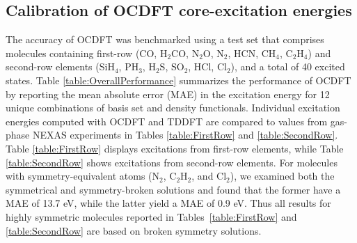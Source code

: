 \documentclass[12pt]{article}
\begin{document}
\subsection{Calibration of OCDFT core-excitation energies}
The accuracy of OCDFT was benchmarked using a test set that comprises molecules containing first-row (CO, H$_2$CO, N$_2$O, N$_2$, HCN, CH$_4$, C$_2$H$_4$) and second-row elements (SiH$_4$, PH$_3$, H$_2$S, SO$_2$, HCl, Cl$_2$), and a total of 40 excited states. 
Table \ref{table:OverallPerformance} summarizes the performance of OCDFT by reporting the mean absolute error (MAE) in the excitation energy for 12 unique combinations of basis set and density functionals.
Individual excitation energies computed with OCDFT and TDDFT are compared to values from gas-phase NEXAS experiments \cite{puttner_vibrationally_1999,remmers_high-resolution_1992,chen_k-shell_1989,tronc_nitrogen_1980,tronc_carbon_1979,francis_studies_1994,adachi_vibronic_1999,hitchcock_k-shell_1979,domke_carbon_1990,nayandin_angle-resolved_2001,bodeur_single-and_1990,gedat_s_1998,hudson_high-resolution_1994,cavell_chemical_1999,bodeur_photoabsorption_1985} in Tables \ref{table:FirstRow} and \ref{table:SecondRow}. Table \ref{table:FirstRow} displays excitations from first-row elements, while Table \ref{table:SecondRow} shows excitations from second-row elements. For molecules with symmetry-equivalent atoms (N$_2$, C$_2$H$_2$, and Cl$_2$), we examined both the symmetrical and symmetry-broken solutions and found that the former have a MAE of 13.7 eV, while the latter yield a MAE of 0.9 eV.
Thus all results for highly symmetric molecules reported in Tables~\ref{table:FirstRow} and \ref{table:SecondRow} are based on broken symmetry solutions.
\end{document}

